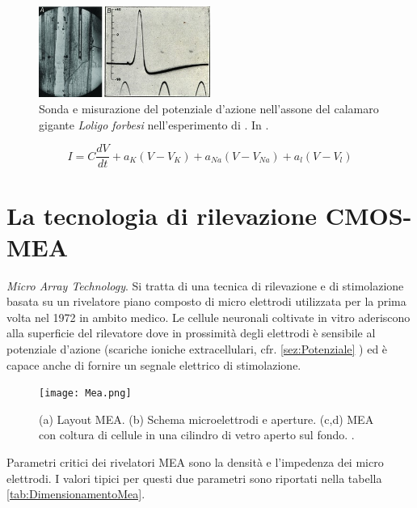 \begin{figure}%
\centering    
\includegraphics[width=0.5\textwidth]{ActionPotential.jpg}
\caption[Esperimento di \cite{Hodgkin1952}]
{ Sonda e misurazione del potenziale d'azione nell'assone del calamaro gigante {\it Loligo forbesi} nell'esperimento di \cite{Hodgkin1952}. In \cite{Schwiening2012}. }
\label{fig:ActionPotential}
\end{figure}


\begin{equation}
 I = C\frac{dV}{dt} + a_{K}(V-V_{K}) + a_{Na}(V-V_{Na}) + a_{l}(V-V_{l})
\end{equation}




\section{La tecnologia di rilevazione CMOS-MEA}
\label{sez:Mea}\label{sez:Rilevazione}

{\it Micro Array Technology}. Si tratta di una tecnica di rilevazione e di stimolazione basata su un rivelatore piano composto di micro elettrodi utilizzata per la prima volta nel 1972 in ambito medico. Le cellule neuronali coltivate in vitro aderiscono alla superficie del rilevatore dove in prossimità degli elettrodi è sensibile al potenziale d'azione (scariche ioniche extracellulari, cfr. \ref{sez:Potenziale} ) ed è capace anche di fornire un segnale elettrico di stimolazione.

\begin{figure}%
\centering    
\texttt{[image: Mea.png]}
\caption[Rivelatore MEA]
{ (a) Layout MEA. (b) Schema microelettrodi e aperture. (c,d) MEA con coltura di cellule in una cilindro di vetro aperto sul fondo.  \cite{Kim2014}. }
\label{fig:MEA}
\end{figure}

Parametri critici dei rivelatori MEA sono la densità e l'impedenza dei micro elettrodi. I valori tipici per questi due parametri sono riportati nella tabella \ref{tab:DimensionamentoMea}.

